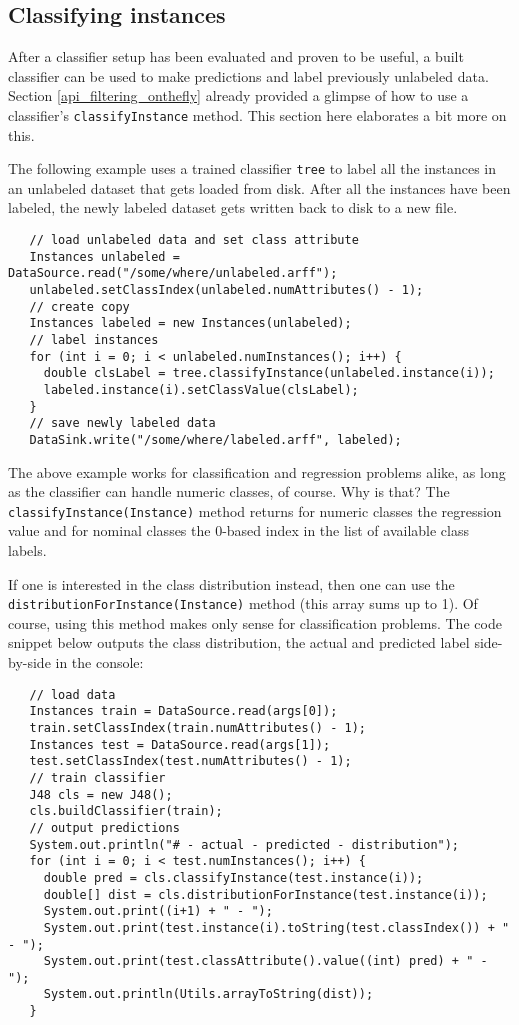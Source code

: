 \newpage

\subsection{Classifying instances}
After a classifier setup has been evaluated and proven to be useful, a built
classifier can be used to make predictions and label previously unlabeled data.
Section \ref{api_filtering_onthefly} already provided a glimpse of how to use a
classifier's \texttt{classifyInstance} method. This section here elaborates a
bit more on this.

The following example uses a trained classifier \texttt{tree} to label all the
instances in an unlabeled dataset that gets loaded from disk. After all the
instances have been labeled, the newly labeled dataset gets written back to
disk to a new file.
\begin{verbatim}
   // load unlabeled data and set class attribute
   Instances unlabeled = DataSource.read("/some/where/unlabeled.arff"); 
   unlabeled.setClassIndex(unlabeled.numAttributes() - 1);
   // create copy
   Instances labeled = new Instances(unlabeled);
   // label instances
   for (int i = 0; i < unlabeled.numInstances(); i++) {
     double clsLabel = tree.classifyInstance(unlabeled.instance(i));
     labeled.instance(i).setClassValue(clsLabel);
   }
   // save newly labeled data
   DataSink.write("/some/where/labeled.arff", labeled);
\end{verbatim}
The above example works for classification and regression problems alike, as
long as the classifier can handle numeric classes, of course. Why is that? The
\texttt{classifyInstance(Instance)} method returns for numeric classes the
regression value and for nominal classes the 0-based index in the list of
available class labels.

If one is interested in the class distribution instead, then one can use the
\texttt{distributionForInstance(Instance)} method (this array sums up to 1). Of
course, using this method makes only sense for classification problems. The code
snippet below outputs the class distribution, the actual and predicted label
side-by-side in the console:
\begin{verbatim}
   // load data
   Instances train = DataSource.read(args[0]);
   train.setClassIndex(train.numAttributes() - 1);
   Instances test = DataSource.read(args[1]);
   test.setClassIndex(test.numAttributes() - 1);
   // train classifier
   J48 cls = new J48();
   cls.buildClassifier(train);
   // output predictions
   System.out.println("# - actual - predicted - distribution");
   for (int i = 0; i < test.numInstances(); i++) {
     double pred = cls.classifyInstance(test.instance(i));
     double[] dist = cls.distributionForInstance(test.instance(i));
     System.out.print((i+1) + " - ");
     System.out.print(test.instance(i).toString(test.classIndex()) + " - ");
     System.out.print(test.classAttribute().value((int) pred) + " - ");
     System.out.println(Utils.arrayToString(dist));
   }
\end{verbatim}

